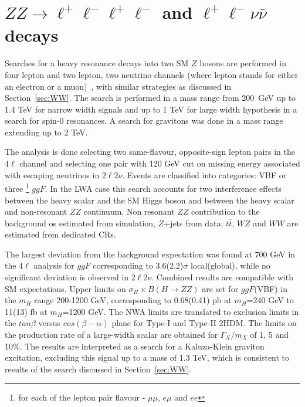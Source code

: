 \documentclass{PoS}
\begin{document}
\section{$ZZ\rightarrow \ell^+\ell^-\ell^+\ell^-$ and $\ell^+\ell^-\nu\bar{\nu}$ decays} %
\label{sec:ZZ}
Searches for a heavy resonance decays into two SM $Z$ bosons are performed in four lepton and two lepton, two neutrino channels (where lepton stands for either an electron or a muon)~\cite{HIGG-2016-19}, with similar strategies as discussed in Section~\ref{sec:WW}. 
The search is performed in a mass range from 200~GeV up to 1.4 TeV for narrow width signals and up to 1 TeV for large width hypothesis in a search for spin-0 resonances. A search for gravitons was done in a mass range extending up to 2 TeV.

The analysis is done selecting two same-flavour, opposite-sign lepton pairs in the $4\ell$ channel and selecting one pair with 120 GeV cut on missing energy associated with escaping neutrinos in $2\ell2\nu$.
Events are classified into categories: VBF or three
\footnote{
 for each of the lepton pair flavour - $\mu\mu$, $e\mu$ and $ee$
 }
 $ggF$.
In the LWA case this search accounts for two interference effects between the heavy scalar and the SM Higgs boson and between the heavy scalar and non-resonant $ZZ$ continuum.
Non resonant $ZZ$ contribution to the background os estimated from simulation, $Z$+jets from data; $t\bar{t}$, $WZ$ and $WW$ are estimated from dedicated CRs.

The largest deviation from the background expectation was found at 700 GeV in the $4\ell$ analysis for $ggF$ corresponding to 3.6(2.2)$\sigma$ local(global), while no significant deviation is observed in $2\ell2\nu$. Combined results are compatible with SM expectations. 
Upper limits on $\sigma_H \times B(H\rightarrow ZZ)$ are set for $ggF$(VBF) in the $m_H$ range 200-1200 GeV, corresponding to 0.68(0.41) pb at $m_H$=240 GeV to 11(13) fb at $m_H$=1200 GeV.
The NWA limits are translated to exclusion limits in the $tan \beta$ versus $cos(\beta-\alpha)$ plane for Type-I and Type-II 2HDM. 
The limits on the production rate of a large-width scalar are obtained for $\Gamma_X/m_X$ of 1, 5 and 10\%. %
The results are interpreted as a search for a Kaluza-Klein graviton excitation, excluding this signal up to a mass of 1.3 TeV, which is consistent to results of the search discussed in Section~\ref{sec:WW}. 
\end{document}
